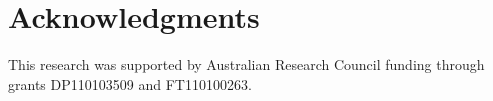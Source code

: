 \documentclass[useAMS,usenatbib,article]{mn2e}
\begin{document}


\section{Acknowledgments}
This research was supported by Australian Research Council funding through grants
DP110103509 and FT110100263.




\label{lastpage}

\clearpage
\end{document}
